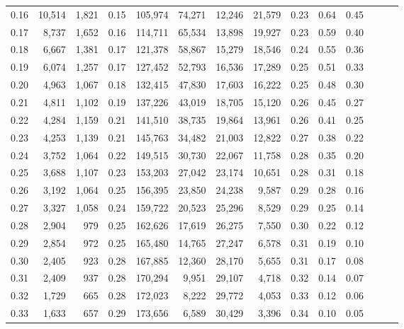 \begin{tabular}{rrrrrrrrrrrrrr}
0.16 &  10,514 &  1,821 &  0.15 &  105,974 &   74,271 &  12,246 &  21,579 &  0.23 &  0.64 &      0.45 \\
0.17 &   8,737 &  1,652 &  0.16 &  114,711 &   65,534 &  13,898 &  19,927 &  0.23 &  0.59 &      0.40 \\
0.18 &   6,667 &  1,381 &  0.17 &  121,378 &   58,867 &  15,279 &  18,546 &  0.24 &  0.55 &      0.36 \\
0.19 &   6,074 &  1,257 &  0.17 &  127,452 &   52,793 &  16,536 &  17,289 &  0.25 &  0.51 &      0.33 \\
0.20 &   4,963 &  1,067 &  0.18 &  132,415 &   47,830 &  17,603 &  16,222 &  0.25 &  0.48 &      0.30 \\
0.21 &   4,811 &  1,102 &  0.19 &  137,226 &   43,019 &  18,705 &  15,120 &  0.26 &  0.45 &      0.27 \\
0.22 &   4,284 &  1,159 &  0.21 &  141,510 &   38,735 &  19,864 &  13,961 &  0.26 &  0.41 &      0.25 \\
0.23 &   4,253 &  1,139 &  0.21 &  145,763 &   34,482 &  21,003 &  12,822 &  0.27 &  0.38 &      0.22 \\
0.24 &   3,752 &  1,064 &  0.22 &  149,515 &   30,730 &  22,067 &  11,758 &  0.28 &  0.35 &      0.20 \\
0.25 &   3,688 &  1,107 &  0.23 &  153,203 &   27,042 &  23,174 &  10,651 &  0.28 &  0.31 &      0.18 \\
0.26 &   3,192 &  1,064 &  0.25 &  156,395 &   23,850 &  24,238 &   9,587 &  0.29 &  0.28 &      0.16 \\
0.27 &   3,327 &  1,058 &  0.24 &  159,722 &   20,523 &  25,296 &   8,529 &  0.29 &  0.25 &      0.14 \\
0.28 &   2,904 &    979 &  0.25 &  162,626 &   17,619 &  26,275 &   7,550 &  0.30 &  0.22 &      0.12 \\
0.29 &   2,854 &    972 &  0.25 &  165,480 &   14,765 &  27,247 &   6,578 &  0.31 &  0.19 &      0.10 \\
0.30 &   2,405 &    923 &  0.28 &  167,885 &   12,360 &  28,170 &   5,655 &  0.31 &  0.17 &      0.08 \\
0.31 &   2,409 &    937 &  0.28 &  170,294 &    9,951 &  29,107 &   4,718 &  0.32 &  0.14 &      0.07 \\
0.32 &   1,729 &    665 &  0.28 &  172,023 &    8,222 &  29,772 &   4,053 &  0.33 &  0.12 &      0.06 \\
0.33 &   1,633 &    657 &  0.29 &  173,656 &    6,589 &  30,429 &   3,396 &  0.34 &  0.10 &      0.05 \\

\end{tabular}
